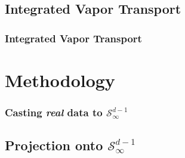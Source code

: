 \documentclass[aspectratio=169]{beamer}
\begin{document}
\subsection{Integrated Vapor Transport}
\begin{frame}
  \frametitle{Integrated Vapor Transport}
\end{frame}

\section{Methodology}

\begin{frame}
  \frametitle{Casting \emph{real} data to $\mathcal{S}_{\infty}^{d-1}$}
\end{frame}

\subsection{Projection onto $\mathcal{S}_{\infty}^{d-1}$}
\end{document}
